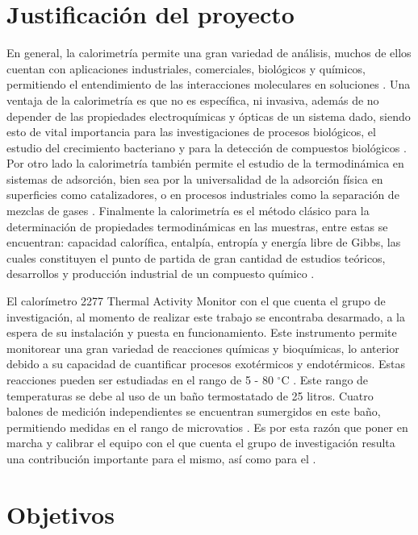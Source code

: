 \section{Justificación del proyecto}
	En general, la calorimetría permite una gran variedad de análisis, muchos de ellos cuentan con aplicaciones industriales, comerciales, biológicos y químicos, permitiendo el entendimiento de las interacciones moleculares en soluciones \cite{blandamer1998titration}. Una ventaja de la calorimetría es que no es específica, ni invasiva, además de no depender de las propiedades electroquímicas y ópticas de un sistema dado, siendo esto de vital importancia para las investigaciones de procesos biológicos, el estudio del crecimiento bacteriano y para la detección de compuestos biológicos \cite{winkelmann2004application}. Por otro lado la calorimetría también permite el estudio de la termodinámica en sistemas de adsorción, bien sea por la universalidad de la adsorción física en superficies como catalizadores, o en procesos industriales como la separación de mezclas de gases \cite{morrison1987calorimetry}. Finalmente la calorimetría es el método clásico para la determinación de propiedades termodinámicas en las muestras, entre estas se encuentran: capacidad calorífica, entalpía, entropía y energía libre de Gibbs, las cuales constituyen el punto de partida de gran cantidad de estudios teóricos, desarrollos y producción industrial de un compuesto químico \cite{wang2005determination, gaisford2016principles}.
	
	El calorímetro 2277 Thermal Activity Monitor con el que cuenta el grupo de investigación, al momento de realizar este trabajo se encontraba desarmado, a la espera de su instalaci\'on y puesta en funcionamiento. Este instrumento permite monitorear una gran variedad de reacciones químicas y bioquímicas, lo anterior debido a su capacidad de cuantificar procesos exotérmicos y endotérmicos. Estas reacciones pueden ser estudiadas en el rango de 5 - 80 $^\circ$C \cite{Suurkuusk}. Este rango de temperaturas se debe al uso de un baño termostatado de 25 litros. Cuatro balones de medición independientes se encuentran sumergidos en este baño, permitiendo medidas en el rango de microvatios \cite{Suurkuusk}. Es por esta razón que poner en marcha y calibrar el equipo con el que cuenta el grupo de investigación resulta una contribución importante para el mismo, así como para el \deptname.
	
	\newpage
\section{Objetivos}
